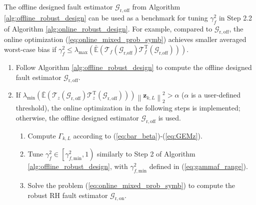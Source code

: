 \documentclass[twocolumn]{autart}
\begin{document}
The offline designed fault estimator $\mathcal{G}_{\mathrm{r,off}}$ from Algorithm \ref{alg:offline_robust_design} can be used as a benchmark for tuning $\gamma_f^2$ in Step 2.2 of Algorithm \ref{alg:online_robust_design}. For example, compared to $\mathcal{G}_{\mathrm{r,off}}$, the online optimization (\ref{eq:online_mixed_prob_symb}) achieves smaller averaged worst-case bias if $\gamma_f^2 \leq \lambda_{\text{max}}\left(\mathbb{\bar E} \left( {\mathcal{T}}_{f} \left( \mathcal{G}_{\text{r,off}} \right) {\mathcal{T}}_{f}^\text{T} \left( \mathcal{G}_{\text{r,off}} \right) \right)\right)$.

\begin{algorithm}
  \caption{Data-driven robust RH fault estimation with online optimization}
  \label{alg:online_robust_design}
  \begin{algorithmic}
    \State
    \begin{enumerate}
      \item[1)] Follow Algorithm \ref{alg:offline_robust_design} to compute the offline designed fault estimator $\mathcal{G}_{\mathrm{r,off}}$.
      \item[2)] If $\lambda_\text{min} \left( \mathbb{\bar E} \left( \mathcal{T}_{z} \left(  \mathcal{G}_{\mathrm{r,off}} \right) \mathcal{T}_{z}^\mathrm{T} \left(  \mathcal{G}_{\mathrm{r,off}} \right) \right) \right)  \left\| \mathbf{z}_{k,L} \right\|_2^2 > \alpha$ ($\alpha$ is a user-defined threshold), the online optimization in the following steps is implemented; otherwise, the offline designed estimator $\mathcal{G}_{\mathrm{r,off}}$ is used.
          \begin{enumerate}
            \item[2.1)] Compute $\Gamma_{k,L}$ according to (\ref{eq:bar_beta})-(\ref{eq:GEMz}).
            \item[2.2)] Tune $\gamma_f^2 \in \left[ \gamma_{f,\text{min}}^2, 1 \right)$ similarly to Step 2 of Algorithm \ref{alg:offline_robust_design}, with $\gamma_{f,\text{min}}^2$ defined in (\ref{eq:gammaf_range}).
            \item[2.3)] Solve the problem (\ref{eq:online_mixed_prob_symb}) to compute the robust RH fault estimator $\mathcal{G}_{\mathrm{r,on}}$.
          \end{enumerate}
    \end{enumerate}
  \end{algorithmic}
\end{algorithm}
\end{document}
